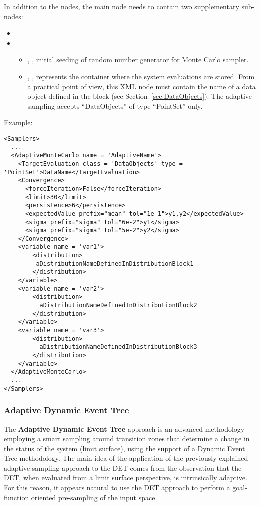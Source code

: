  In addition to the  nodes, the main
 node needs to contain two supplementary
sub-nodes:

\begin{itemize}
  \item \convergenceDescriptionAMC
  \item {}
    \begin{itemize}
      \item {}, ,
      initial seeding of random number generator for Monte Carlo sampler.

      \item {}, ,
        represents the container where the system evaluations are stored.
        From a practical point of view, this XML node must contain the name of
        a data object defined in the  block (see
        Section~\ref{sec:DataObjects}).
        The adaptive sampling accepts ``DataObjects'' of type
        ``PointSet'' only.
    \end{itemize}
\end{itemize}


Example:
\begin{lstlisting}[style=XML]
<Samplers>
  ...
  <AdaptiveMonteCarlo name = 'AdaptiveName'>
    <TargetEvaluation class = 'DataObjects' type = 'PointSet'>DataName</TargetEvaluation>
    <Convergence>
      <forceIteration>False</forceIteration>
      <limit>30</limit>
      <persistence>6</persistence>
      <expectedValue prefix="mean" tol="1e-1">y1,y2</expectedValue>
      <sigma prefix="sigma" tol="6e-2">y1</sigma>
      <sigma prefix="sigma" tol="5e-2">y2</sigma>
    </Convergence>
    <variable name = 'var1'>
        <distribution>
         aDistributionNameDefinedInDistributionBlock1
        </distribution>
    </variable>
    <variable name = 'var2'>
        <distribution>
          aDistributionNameDefinedInDistributionBlock2
        </distribution>
    </variable>
    <variable name = 'var3'>
        <distribution>
          aDistributionNameDefinedInDistributionBlock3
        </distribution>
    </variable>
  </AdaptiveMonteCarlo>
  ...
</Samplers>
\end{lstlisting}

\subsubsection{Adaptive Dynamic Event Tree}
\label{subsubsubsec:ADET}
The \textbf{Adaptive Dynamic Event Tree} approach is an advanced methodology
employing a smart sampling around transition zones that determine a change in
the status of the system (limit surface), using the support of a Dynamic Event
Tree methodology.
%
The main idea of the application of the previously explained adaptive sampling
approach to the DET comes from the observation that the DET, when evaluated from
a limit surface perspective, is intrinsically adaptive.
%
For this reason, it appears natural to use the DET approach to perform a
goal-function oriented pre-sampling of the input space.

